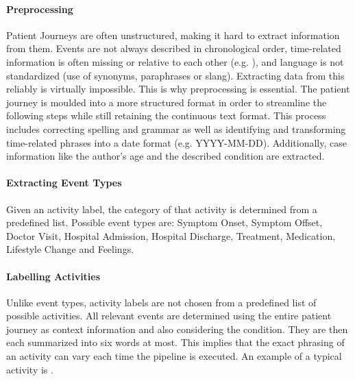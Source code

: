 \paragraph{Preprocessing} Patient Journeys are often unstructured, making it hard to extract information from them. Events are not always described in chronological order, time-related information is often missing or relative to each other (e.g. ), and language is not standardized (use of synonyms, paraphrases or slang). Extracting data from this reliably is virtually impossible. This is why preprocessing is essential. The patient journey is moulded into a more structured format in order to streamline the following steps while still retaining the continuous text format. This process includes correcting spelling and grammar as well as identifying and transforming time-related phrases into a date format (e.g. YYYY-MM-DD). Additionally, case information like the author's age and the described condition are extracted.
\paragraph{Extracting Event Types} Given an activity label, the category of that activity is determined from a predefined list. Possible event types are: Symptom Onset, Symptom Offset, Doctor Visit, Hospital Admission, Hospital Discharge, Treatment, Medication, Lifestyle Change and Feelings.
\paragraph{Labelling Activities} Unlike event types, activity labels are not chosen from a predefined list of possible activities. All relevant events are determined using the entire patient journey as context information and also considering the condition. They are then each summarized into six words at most. This implies that the exact phrasing of an activity can vary each time the pipeline is executed. An example of a typical activity is .
